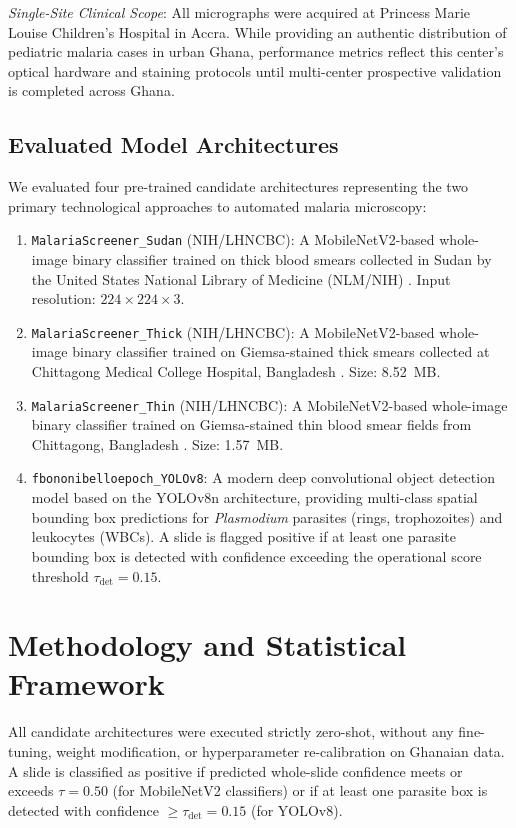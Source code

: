 \documentclass[10pt,journal,compsoc]{IEEEtran}
\begin{document}
\textit{Single-Site Clinical Scope}: All micrographs were acquired at Princess Marie Louise Children's Hospital in Accra. While providing an authentic distribution of pediatric malaria cases in urban Ghana, performance metrics reflect this center's optical hardware and staining protocols until multi-center prospective validation is completed across Ghana.

\subsection{Evaluated Model Architectures}
We evaluated four pre-trained candidate architectures representing the two primary technological approaches to automated malaria microscopy:
\begin{enumerate}
    \item \texttt{MalariaScreener\_Sudan} (NIH/LHNCBC): A MobileNetV2-based whole-image binary classifier trained on thick blood smears collected in Sudan by the United States National Library of Medicine (NLM/NIH) \cite{yu2020malaria}. Input resolution: $224 \times 224 \times 3$.
    \item \texttt{MalariaScreener\_Thick} (NIH/LHNCBC): A MobileNetV2-based whole-image binary classifier trained on Giemsa-stained thick smears collected at Chittagong Medical College Hospital, Bangladesh \cite{yang2020deep}. Size: 8.52~MB.
    \item \texttt{MalariaScreener\_Thin} (NIH/LHNCBC): A MobileNetV2-based whole-image binary classifier trained on Giemsa-stained thin blood smear fields from Chittagong, Bangladesh \cite{rajaraman2018pretrained}. Size: 1.57~MB.
    \item \texttt{fbononibelloepoch\_YOLOv8}: A modern deep convolutional object detection model based on the YOLOv8n architecture, providing multi-class spatial bounding box predictions for \textit{Plasmodium} parasites (rings, trophozoites) and leukocytes (WBCs). A slide is flagged positive if at least one parasite bounding box is detected with confidence exceeding the operational score threshold $\tau_{\text{det}} = 0.15$.
\end{enumerate}

\section{Methodology and Statistical Framework}
All candidate architectures were executed strictly zero-shot, without any fine-tuning, weight modification, or hyperparameter re-calibration on Ghanaian data. A slide is classified as positive if predicted whole-slide confidence meets or exceeds $\tau = 0.50$ (for MobileNetV2 classifiers) or if at least one parasite box is detected with confidence $\ge \tau_{\text{det}} = 0.15$ (for YOLOv8).
\end{document}
